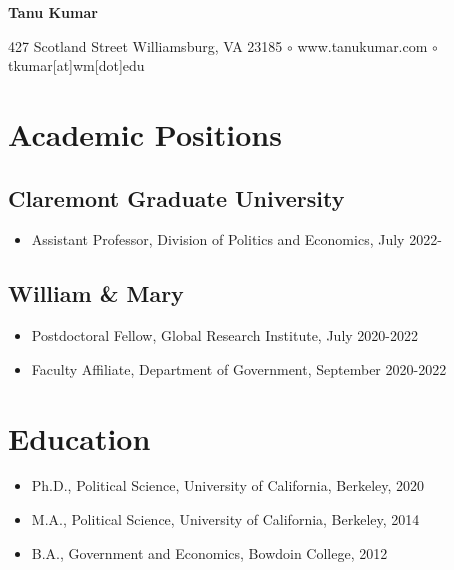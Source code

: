 \documentclass[11pt]{article}
\begin{document}
\begin{center}
{\huge\textbf{Tanu Kumar}}


\vspace{1mm}

427 Scotland Street Williamsburg, VA 23185 $\circ$
	 www.tanukumar.com $\circ$
	 tkumar[at]wm[dot]edu

\noindent \hrulefill
\end{center}
\section*{Academic Positions}


\subsection*{Claremont Graduate University}
	\begin{itemize}[nosep]
		\item[] Assistant Professor, Division of Politics and Economics, July 2022-	


	
\end{itemize}	
\subsection*{William \& Mary}
	\begin{itemize}[nosep]
		\item[] Postdoctoral Fellow, Global Research Institute, July 2020-2022
		\item[]Faculty Affiliate, Department of Government, September 2020-2022
	


	
\end{itemize}

	

\vspace{2mm}

\section*{Education}

	\begin{itemize}[nosep]
		\item[]Ph.D., Political Science, University of California, Berkeley, 2020


	\item[]M.A., Political Science, University of California, Berkeley, 2014
	\item[]B.A., Government and Economics, Bowdoin College, 2012

\end{itemize}
\end{document}
